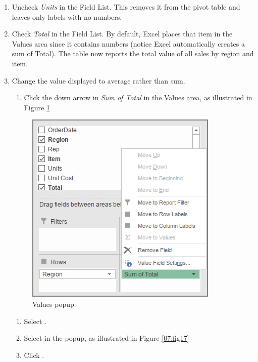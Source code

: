 \begin{enumerate}[resume]
	\item Uncheck \textit{Units} in the Field List. This removes it from the pivot table and leaves only labels with no numbers.
	\item Check \textit{Total} in the Field List. By default, Excel places that item in the Values area since it contains numbers (notice Excel automatically creates a sum of Total). The table now reports the total value of all sales by region and item.
	\item Change the value displayed to average rather than sum.
	
	\begin{enumerate}[resume]
		\item Click the down arrow in \textit{Sum of Total} in the Values area, as illustrated in Figure \ref{07:fig16}
\end{enumerate}

\begin{figure}[H]
	\centering
	\includegraphics[width=\maxwidth{.95\linewidth}]{gfx/ch07_fig16}
	\caption{Values popup}
	\label{07:fig16}
\end{figure}

\begin{enumerate}[resume]
		\item Select .
		\item Select  in the popup, as illustrated in Figure \ref{07:fig17}
		\item Click .
\end{enumerate}


\end{enumerate}
